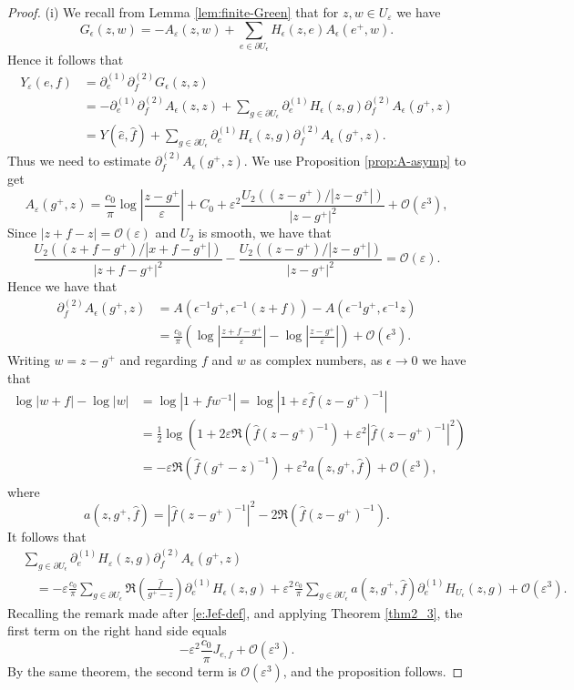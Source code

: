 \documentclass[11pt]{article}
\theoremstyle{remark}
\def\eps{\varepsilon}
\newcommand{\eqnsplst}[1]{\begin{equation*}\begin{split}%
   #1\end{split}\end{equation*}}
\begin{document}
\begin{proof}
(i)    We recall from Lemma \ref{lem:finite-Green} that for $z, w \in U_\eps$ we have
    \[
        G_{\epsilon}(z,w) = -A_\eps(z,w) + \sum_{e \in \partial U_\epsilon} H_{\epsilon}(z,e) A_\epsilon(e^+,w).
    \]
    Hence it follows that 
    \eqnsplst{
        Y_\eps(e,f)
        &= \partial_e^{(1)} \partial_f^{(2)} G_{\epsilon}(z,z) \\
        &= -\partial_e^{(1)} \partial_f^{(2)} A_\epsilon(z,z) 
          + \sum_{g \in \partial U_\epsilon} \partial_e^{(1)}
            H_{\epsilon}(z,g) \partial_f^{(2)} A_\epsilon(g^+,z) \\
        &= Y( \hat{e}, \hat{f} ) 
          + \sum_{g \in \partial U_\epsilon} \partial_e^{(1)}
            H_{\epsilon}(z,g) \partial_f^{(2)} A_\epsilon(g^+,z). }
    Thus we need to estimate \(\partial_f^{(2)} A_\epsilon(g^+,z)\). 
    We use Proposition \ref{prop:A-asymp} to get
    \[
        A_\eps(g^+,z) =  \frac{c_0}{\pi} \log \left|\frac{z - g^+}{\eps}\right| + C_0 
        + \eps^2 \frac{U_2((z - g^+)/|z - g^+|)}{|z - g^+|^{2}} 
        + \mathcal{O}(\eps^3), 
    \]
    Since $|z + f - z| = \mathcal{O}(\eps)$ and $U_2$ is smooth, we have that
    \[ \frac{U_2((z + f - g^+)/|x + f - g^+|)}{|z + f - g^+|^{2}} - 
       \frac{U_2((z - g^+)/|z - g^+|)}{|z - g^+|^{2}} 
       = \mathcal{O}(\eps). \]
    Hence we have that 
    \eqnsplst{
        \partial_f^{(2)} A_\epsilon(g^+, z) 
        &= A(\epsilon^{-1} g^+, \epsilon^{-1} (z + f)) 
        - A(\epsilon^{-1} g^+, \epsilon^{-1} z) \\
        &= \frac{c_0}{\pi} \left( \log \left| \frac{z + f - g^+}{\eps} \right| 
          - \log \left| \frac{z - g^+}{\eps} \right| \right) + \mathcal{O}(\epsilon^3). }
    Writing $w = z - g^+$ and regarding $f$ and $w$
    as complex numbers, as \(\epsilon \rightarrow 0\) we have that
    \eqnsplst{
        \log |w + f| - \log|w| 
        &= \log | 1 + f w^{-1}| 
        = \log | 1 + \eps \hat{f} (z-g^+)^{-1} | \\
        &= \frac{1}{2} \log \left( 1 + 2 \eps \Re( \hat{f} (z-g^+)^{-1} ) 
           + \eps^{2} |\hat{f} (z-g^+)^{-1}|^2 \right) \\
        &= - \eps \Re( \hat{f} (g^+-z)^{-1} ) + \eps^{2} a(z,g^+,\hat{f}) 
           + \mathcal{O}(\eps^{3}), }
    where 
    \[ a(z,g^+,\hat{f})
       = |\hat{f} (z-g^+)^{-1}|^2 - 2 \Re( \hat{f} (z-g^+)^{-1} ). \]
    It follows that 
    \eqnsplst{
        &\sum_{g \in \partial U_\epsilon} \partial_e^{(1)} H_{\eps}(z,g) \partial_f^{(2)} A_\epsilon(g^+,z) \\
        &\quad = - \eps \frac{c_0}{\pi} \sum_{g \in \partial U_\epsilon} \Re \left( \frac{\hat{f}}{g^+-z} \right) 
        \partial_e^{(1)} H_{\epsilon}(z,g)  
           + \eps^2 \frac{c_0}{\pi} \sum_{g \in \partial U_\epsilon} a(z,g^+,\hat{f})
             \partial_e^{(1)} H_{U_\epsilon}(z,g) + \mathcal{O}(\eps^{3}). }
    Recalling the remark made after \eqref{e:Jef-def}, and 
    applying Theorem \ref{thm2_3}, the first term on the right hand side equals
    \[ - \eps^2 \frac{c_0}{\pi} J_{e,f} + \mathcal{O}(\eps^{3}). \]
    By the same theorem, the second term is $\mathcal{O}(\eps^{3})$, 
    and the proposition follows.
\end{proof}
\end{document}
